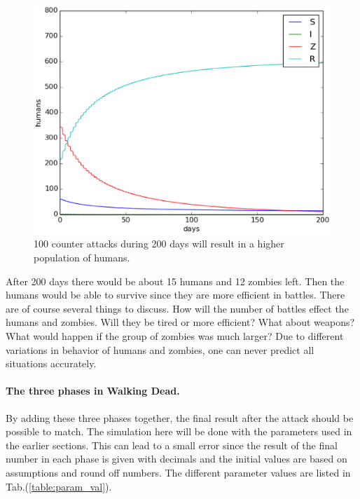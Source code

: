 \documentclass[%
twoside,                 %
final,                   %
10pt]{article}
\begin{document}
\begin{figure}[ht]
  \centerline{\includegraphics[width=0.9\linewidth]{plots/WD_zombie_counter_series.eps}}
  \caption{
  \label{fig:counter_series} 100 counter attacks during 200 days will result in a higher population of humans.
  }
\end{figure}


After 200 days there would be about 15 humans and 12 zombies left. Then the humans would be able to survive since they are more efficient in battles. There are of course several things to discuss. How will the number of battles effect the humans and zombies. Will they be tired or more efficient? What about weapons? What would happen if the group of zombies was much larger? Due to different variations in behavior of humans and zombies, one can never predict all situations accurately. 

\paragraph{The three phases in Walking Dead.}
By adding these three phases together, the final result after the attack should be possible to match. The simulation here will be done with the parameters used in the earlier sections. This can lead to a small error since the result of the final number in each phase is given with decimals and the initial values are based on assumptions and round off numbers. The different parameter values are listed in Tab.(\ref{table:param_val}). 

\label{table:param_val}
\end{document}
